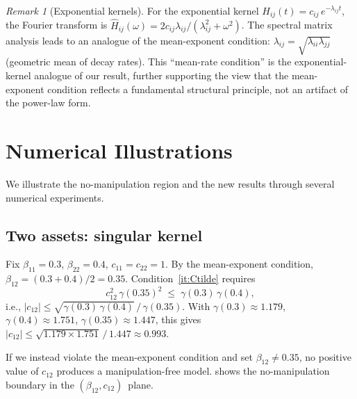 \documentclass[12pt]{article}
\theoremstyle{definition}
\theoremstyle{remark}
\newtheorem{remark}[theorem]{Remark}
\begin{document}
\begin{remark}[Exponential kernels]
For the exponential kernel $H_{ij}(t) = c_{ij}\,e^{-\lambda_{ij}t}$, the
Fourier transform is $\widehat{H}_{ij}(\omega) = 2c_{ij}\lambda_{ij}/(\lambda_{ij}^2+\omega^2)$.
The spectral matrix analysis leads to an analogue of the mean-exponent condition:
$\lambda_{ij} = \sqrt{\lambda_{ii}\lambda_{jj}}$ (geometric mean of decay rates).
This ``mean-rate condition'' is the exponential-kernel analogue of our result,
further supporting the view that the mean-exponent condition reflects a fundamental
structural principle, not an artifact of the power-law form.
\end{remark}


\section{Numerical Illustrations}\label{sec:numerical}

We illustrate the no-manipulation region and the new results through several
numerical experiments.

\subsection{Two assets: singular kernel}\label{sec:num2}

Fix $\beta_{11}=0.3$, $\beta_{22}=0.4$, $c_{11}=c_{22}=1$.
By the mean-exponent condition, $\beta_{12}=(0.3+0.4)/2=0.35$.
Condition~\ref{it:Ctilde} requires
\[
  c_{12}^2\,\gamma(0.35)^2 \;\le\; \gamma(0.3)\,\gamma(0.4),
\]
i.e., $|c_{12}|\le \sqrt{\gamma(0.3)\,\gamma(0.4)}\,/\,\gamma(0.35)$.
With $\gamma(0.3)\approx 1.179$, $\gamma(0.4)\approx 1.751$, $\gamma(0.35)\approx 1.447$, this
gives $|c_{12}|\le \sqrt{1.179\times 1.751}\,/\,1.447 \approx 0.993$.

If we instead violate the mean-exponent condition and set $\beta_{12}\neq 0.35$,
no positive value of $c_{12}$ produces a manipulation-free model.
 shows the no-manipulation boundary in the $(\beta_{12},c_{12})$~plane.
\end{document}

